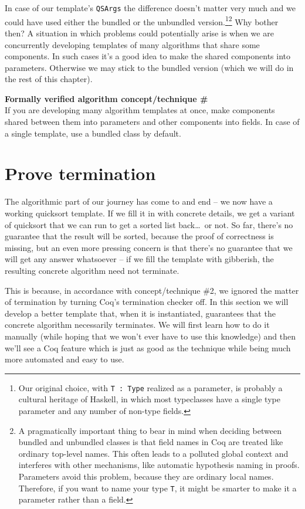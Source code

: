 \documentclass[declaration,mgr,english,shortabstract]{iithesis}
\newcommand{\m}[1]{\texttt{#1}}
\newcounter{cnt}
\newcommand{\runcnt}{\#\arabic{cnt}}
\newcommand{\concept}[1]
{
    \refstepcounter{cnt}
    \begin{center}
        \textbf{Formally verified algorithm concept/technique \runcnt} \\
        #1
    \end{center}
}
\begin{document}
In case of our template's \m{QSArgs} the difference doesn't matter very much and we could have used either the bundled or the unbundled version.\footnote{Our original choice, with \m{T\ :\ Type} realized as a parameter, is probably a cultural heritage of Haskell, in which most typeclasses have a single type parameter and any number of non-type fields.}\footnote{A pragmatically important thing to bear in mind when deciding between bundled and unbundled classes is that field names in Coq are treated like ordinary top-level names. This often leads to a polluted global context and interferes with other mechanisms, like automatic hypothesis naming in proofs. Parameters avoid this problem, because they are ordinary local names. Therefore, if you want to name your type \m{T}, it might be smarter to make it a parameter rather than a field.} Why bother then? A situation in which problems could potentially arise is when we are concurrently developing templates of many algorithms that share some components. In such cases it's a good idea to make the shared components into parameters. Otherwise we may stick to the bundled version (which we will do in the rest of this chapter).

\concept{If you are developing many algorithm templates at once, make components shared between them into parameters and other components into fields. In case of a single template, use a bundled class by default.}

\chapter{Prove termination} \label{termination}

The algorithmic part of our journey has come to and end -- we now have a working quicksort template. If we fill it in with concrete details, we get a variant of quicksort that we can run to get a sorted list back\dots\ or not. So far, there's no guarantee that the result will be sorted, because the proof of correctness is missing, but an even more pressing concern is that there's no guarantee that we will get any answer whatsoever -- if we fill the template with gibberish, the resulting concrete algorithm need not terminate.

This is because, in accordance with concept/technique \#2, we ignored the matter of termination by turning Coq's termination checker off. In this section we will develop a better template that, when it is instantiated, guarantees that the concrete algorithm necessarily terminates. We will first learn how to do it manually (while hoping that we won't ever have to use this knowledge) and then we'll see a Coq feature which is just as good as the technique while being much more automated and easy to use.
\end{document}
